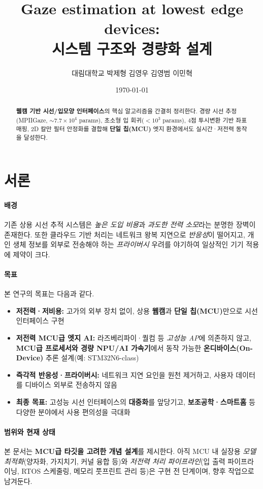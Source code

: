 \documentclass[10pt,a4paper]{article}
\title{Gaze estimation at lowest edge devices: \\ 시스템 구조와 경량화 설계}
\author{대림대학교 박제형 김영우 김영범 이민혁}
\date{\today}
\begin{document}
\maketitle

\begin{abstract}
\textbf{웹캠 기반 시선/입모양 인터페이스}의 핵심 알고리즘을 간결히 정리한다. 경량 시선 추정(MPIIGaze, $\sim7.7\times10^4$ params), 초소형 입 회귀($<10^3$ params), 4점 투시변환 기반 좌표 매핑, 2D 칼만 필터 안정화를 결합해 \textbf{단일 칩(MCU)} 엣지 환경에서도 실시간·저전력 동작을 달성한다.
\end{abstract}

\section{서론}
\paragraph{배경} 기존 상용 시선 추적 시스템은 \emph{높은 도입 비용}과 \emph{과도한 전력 소모}라는 분명한 장벽이 존재한다. 또한 클라우드 기반 처리는 네트워크 왕복 지연으로 \emph{반응성}이 떨어지고, 개인 생체 정보를 외부로 전송해야 하는 \emph{프라이버시} 우려를 야기하여 일상적인 기기 적용에 제약이 크다.

\paragraph{목표} 본 연구의 목표는 다음과 같다.
\begin{itemize}
  \item \textbf{저전력·저비용:} 고가의 외부 장치 없이, 상용 \textbf{웹캠}과 \textbf{단일 칩(MCU)}만으로 시선 인터페이스 구현
  \item \textbf{저전력 MCU급 엣지 AI:} 라즈베리파이·퀄컴 등 \emph{고성능 AP}에 의존하지 않고, \textbf{MCU급 프로세서와 경량 NPU/AI 가속기}에서 동작 가능한 \textbf{온디바이스(On-Device)} 추론 설계(예: STM32N6-class)
  \item \textbf{즉각적 반응성·프라이버시:} 네트워크 지연 요인을 원천 제거하고, 사용자 데이터를 디바이스 외부로 전송하지 않음
  \item \textbf{최종 목표:} 고성능 시선 인터페이스의 \textbf{대중화}를 앞당기고, \textbf{보조공학·스마트홈} 등 다양한 분야에서 사용 편의성을 극대화
\end{itemize}

\paragraph{범위와 현재 상태} 본 문서는 \textbf{MCU급 타깃을 고려한 개념 설계}를 제시한다. 아직 MCU 내 실장용 \emph{모델 최적화}(양자화, 가지치기, 커널 융합 등)와 \emph{저전력 처리 파이프라인}(입\,\/\,출력 파이프라이닝, RTOS 스케줄링, 메모리 풋프린트 관리 등)은 구현 전 단계이며, 향후 작업으로 남겨둔다.
\end{document}
